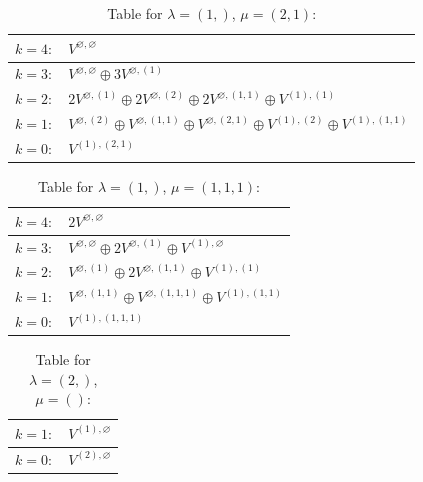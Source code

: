\renewcommand{\arraystretch}{1.6} 
\begin{table}[H]
\centering
\caption{Table for $\lambda = (1,)$, $\mu = (2, 1)$:}
\begin{tabular}{|>{\centering\arraybackslash}p{15cm}|}
\hline
 $k = 4: \quad V^{\varnothing, \varnothing} $ \\ \hline
 $k = 3: \quad V^{\varnothing, \varnothing} \oplus 3 V^{\varnothing, (1)} $ \\ \hline
 $k = 2: \quad 2 V^{\varnothing, (1)} \oplus 2 V^{\varnothing, (2)} \oplus 2 V^{\varnothing, (1, 1)} \oplus V^{(1), (1)} $ \\ \hline
 $k = 1: \quad V^{\varnothing, (2)} \oplus V^{\varnothing, (1, 1)} \oplus V^{\varnothing, (2, 1)} \oplus V^{(1), (2)} \oplus V^{(1), (1, 1)} $ \\ \hline
 $k = 0: \quad V^{(1), (2, 1)} $ \\ \hline
\end{tabular}
\end{table}

\renewcommand{\arraystretch}{1.6} 
\begin{table}[H]
\centering
\caption{Table for $\lambda = (1,)$, $\mu = (1, 1, 1)$:}
\begin{tabular}{|>{\centering\arraybackslash}p{15cm}|}
\hline
 $k = 4: \quad 2 V^{\varnothing, \varnothing} $ \\ \hline
 $k = 3: \quad V^{\varnothing, \varnothing} \oplus 2 V^{\varnothing, (1)} \oplus V^{(1), \varnothing} $ \\ \hline
 $k = 2: \quad V^{\varnothing, (1)} \oplus 2 V^{\varnothing, (1, 1)} \oplus V^{(1), (1)} $ \\ \hline
 $k = 1: \quad V^{\varnothing, (1, 1)} \oplus V^{\varnothing, (1, 1, 1)} \oplus V^{(1), (1, 1)} $ \\ \hline
 $k = 0: \quad V^{(1), (1, 1, 1)} $ \\ \hline
\end{tabular}
\end{table}

\renewcommand{\arraystretch}{1.6} 
\begin{table}[H]
\centering
\caption{Table for $\lambda = (2,)$, $\mu = ()$:}
\begin{tabular}{|>{\centering\arraybackslash}p{15cm}|}
\hline
 $k = 1: \quad V^{(1), \varnothing} $ \\ \hline
 $k = 0: \quad V^{(2), \varnothing} $ \\ \hline
\end{tabular}
\end{table}

